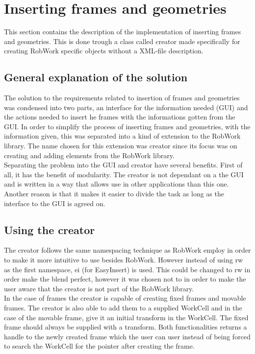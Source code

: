 \section{Inserting frames and geometries}
This section contains the description of the implementation of inserting frames and geometries. This is done trough a class called creator made specifically for creating RobWork specific objects without a XML-file description.

\subsection{General explanation of the solution}
\label{subsec:iFramesAGeomsGE}
The solution to the requirements related to insertion of frames and geometries was condensed into two parts, an interface for the information needed (GUI) and the actions needed to insert he frames with the informations gotten from the GUI. In order to simplify the process of inserting frames and geometries, with the information given, this was separated into a kind of extension to the RobWork library. The name chosen for this extension was creator since its focus was on creating and adding elements from the RobWork library.\\

Separating the problem into the GUI and creator have several benefits. First of all, it has the benefit of modularity. The creator is not dependant on a the GUI and is written in a way that allows use in other applications than this one.\\
Another reason is that it makes it easier to divide the task as long as the interface to the GUI is agreed on.

\subsection{Using the creator}
The creator follows the same namespacing technique as RobWork employ in order to make it more intuitive to use besides RobWork. However instead of using rw as the first namespace, ei (for EasyInsert) is used. This could be changed to rw in order make the blend perfect, however it was chosen not to in order to make the user aware that the creator is not part of the RobWork library.\\

In the case of frames the creator is capable of creating fixed frames and movable frames. The creator is also able to add them to a supplied WorkCell and in the case of the movable frame, give it an initial transform in the WorkCell. The fixed frame should always be supplied with a transform. 
Both functionalities returns a handle to the newly created frame which the user can user instead of being forced to search the WorkCell for the pointer after creating the frame.\\

